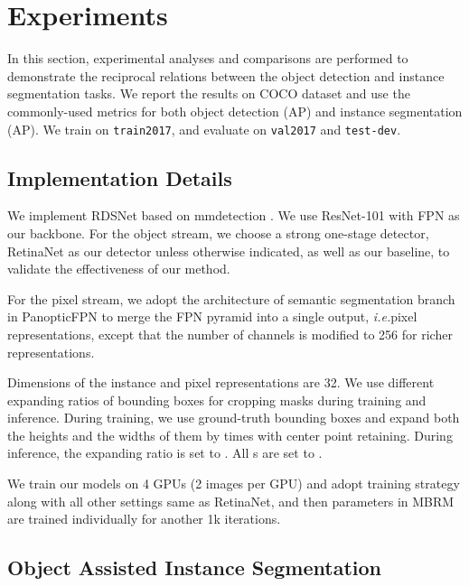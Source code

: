 \documentclass[letterpaper]{article} \usepackage{aaai20}  \usepackage{times}  \usepackage{helvet} \usepackage{courier}  \usepackage[hyphens]{url}  \usepackage{graphicx} \urlstyle{rm} \def\UrlFont{\rm}  \usepackage{graphicx}  \frenchspacing  \setlength{\pdfpagewidth}{8.5in}  \setlength{\pdfpageheight}{11in}
\newcommand{\ie}{\textit{i.e.}}
\begin{document}
\section{Experiments}
In this section, experimental analyses and comparisons are performed to demonstrate the reciprocal relations between the object detection and instance segmentation tasks. We report the results on COCO dataset \cite{lin2014microsoft} and use the commonly-used metrics for both object detection (AP) and instance segmentation (AP). We train on \texttt{train2017}, and evaluate on \texttt{val2017} and \texttt{test-dev}. 


\subsection{Implementation Details}\label{sec:detail}
We implement RDSNet based on mmdetection \cite{chen2019mmdetection}. We use ResNet-101 \cite{he2016deep} with FPN \cite{lin2017feature} as our backbone. For the object stream, we choose a strong one-stage detector, RetinaNet \cite{lin2017focal} as our detector unless otherwise indicated, as well as our baseline, to validate the effectiveness of our method. 

For the pixel stream, we adopt the architecture of semantic segmentation branch in PanopticFPN \cite{kirillov2019panoptic} to merge the FPN pyramid into a single output, \ie pixel representations, except that the number of channels is modified to 256 for richer representations.

Dimensions of the instance and pixel representations are 32. We use different expanding ratios of bounding boxes for cropping masks during training and inference. During training, we use ground-truth bounding boxes and expand both the heights and the widths of them by  times with center point retaining. During inference, the expanding ratio is set to . All s are set to .

We train our models on 4 GPUs (2 images per GPU) and adopt  training strategy \cite{chen2019mmdetection} along with all other settings same as RetinaNet, and then parameters in MBRM are trained individually for another 1k iterations.

\subsection{Object Assisted Instance Segmentation}
\end{document}
